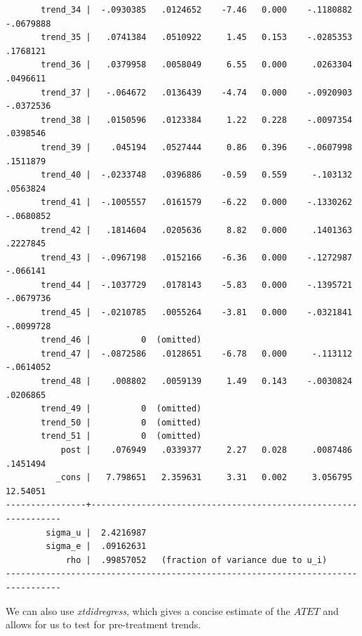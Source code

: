 \documentclass[
]{book}
\newenvironment{Shaded}{\begin{snugshade}}{\end{snugshade}}
\newcommand{\FunctionTok}[1]{\textcolor[rgb]{0.13,0.29,0.53}{\textbf{#1}}}
\newcommand{\KeywordTok}[1]{\textcolor[rgb]{0.13,0.29,0.53}{\textbf{#1}}}
\newcommand{\NormalTok}[1]{#1}
\newcommand{\OtherTok}[1]{\textcolor[rgb]{0.56,0.35,0.01}{#1}}
\begin{document}
\begin{verbatim}
       trend_34 |  -.0930385   .0124652    -7.46   0.000    -.1180882   -.0679888
       trend_35 |   .0741384   .0510922     1.45   0.153    -.0285353    .1768121
       trend_36 |   .0379958   .0058049     6.55   0.000     .0263304    .0496611
       trend_37 |   -.064672   .0136439    -4.74   0.000    -.0920903   -.0372536
       trend_38 |   .0150596   .0123384     1.22   0.228    -.0097354    .0398546
       trend_39 |    .045194   .0527444     0.86   0.396    -.0607998    .1511879
       trend_40 |  -.0233748   .0396886    -0.59   0.559     -.103132    .0563824
       trend_41 |  -.1005557   .0161579    -6.22   0.000    -.1330262   -.0680852
       trend_42 |   .1814604   .0205636     8.82   0.000     .1401363    .2227845
       trend_43 |  -.0967198   .0152166    -6.36   0.000    -.1272987    -.066141
       trend_44 |  -.1037729   .0178143    -5.83   0.000    -.1395721   -.0679736
       trend_45 |  -.0210785   .0055264    -3.81   0.000    -.0321841   -.0099728
       trend_46 |          0  (omitted)
       trend_47 |  -.0872586   .0128651    -6.78   0.000     -.113112   -.0614052
       trend_48 |    .008802   .0059139     1.49   0.143    -.0030824    .0206865
       trend_49 |          0  (omitted)
       trend_50 |          0  (omitted)
       trend_51 |          0  (omitted)
           post |    .076949   .0339377     2.27   0.028     .0087486    .1451494
          _cons |   7.798651   2.359631     3.31   0.002     3.056795    12.54051
----------------+----------------------------------------------------------------
        sigma_u |  2.4216987
        sigma_e |  .09162631
            rho |  .99857052   (fraction of variance due to u_i)
---------------------------------------------------------------------------------
\end{verbatim}

We can also use \emph{xtdidregress}, which gives a concise estimate of the \(ATET\) and allows for us to test for pre-treatment trends.

\begin{Shaded}
\end{Shaded}
\end{document}

